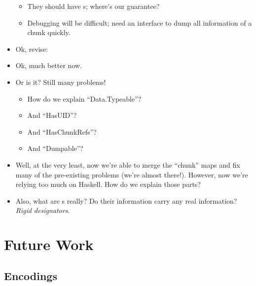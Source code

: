 \begin{itemize}
\begin{itemize}
                  \item They should have \UID{}s; where's our guarantee?

                  \item Debugging will be difficult; need an interface to dump
                        all information of a chunk quickly.

            \end{itemize}

      \item Ok, revise: 

      \item Ok, much better now.

      \item Or is it? Still many problems!
            \begin{itemize}

                  \item How do we explain ``Data.Typeable''?

                  \item And ``HasUID''?

                  \item And ``HasChunkRefs''?

                  \item And ``Dumpable''?

            \end{itemize}

      \item Well, at the very least, now we're able to merge the ``chunk'' maps
            and fix many of the pre-existing problems (we're almost there!).
            However, now we're relying too much on Haskell. How do we explain
            those parts?

      \item Also, what are \UID{}s really? Do their information carry any real
            information? \textit{Rigid designators}.

\end{itemize}

\section{Future Work}

\subsection{Encodings}

